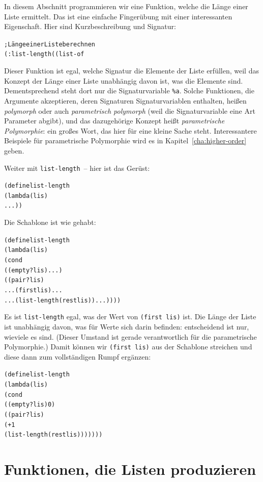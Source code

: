 In diesem Abschnitt programmieren wir eine Funktion, welche die Länge
einer Liste ermittelt. Das ist
eine einfache Fingerübung mit einer interessanten Eigenschaft.  Hier
sind Kurzbeschreibung und Signatur:
%
\begin{alltt}
; Länge einer Liste berechnen
(: list-length ((list-of %
\end{alltt}
%
Dieser Funktion ist egal, welche Signatur
die Elemente der Liste erfüllen, weil das Konzept der Länge einer
Liste unabhängig davon ist, was die Elemente sind.
Dementsprechend steht dort nur die Signaturvariable \verb|%a|.
Solche Funktionen, die Argumente akzeptieren, deren Signaturen
Signaturvariablen enthalten, heißen \textit{polymorph} oder auch
\textit{parametrisch polymorph} (weil die Signaturvariable eine Art
Parameter abgibt), und das dazugehörige Konzept heißt
\textit{parametrische
  Polymorphie}:
ein großes Wort, das hier für eine kleine Sache steht.  Interessantere
Beispiele für parametrische Polymorphie wird es in
Kapitel~\ref{cha:higher-order} geben.

Weiter mit \texttt{list-length}~-- hier ist das Gerüst:
%
\begin{alltt}
(define list-length
  (lambda (lis)
    ...))
\end{alltt}
%
Die Schablone ist wie gehabt:
%
\begin{alltt}
(define list-length
  (lambda (lis)
    (cond
      ((empty? lis) ...)
      ((pair? lis) 
       ... (first lis) ...
       ... (list-length (rest lis)) ...))))
\end{alltt}
%
Es ist \texttt{list-length} egal, was der Wert von \texttt{(first
  lis)} ist.  Die Länge der Liste ist unabhängig davon, was für Werte
sich darin befinden: entscheidend ist nur, wieviele es sind.  (Dieser
Umstand ist gerade verantwortlich für die parametrische Polymorphie.)
Damit können wir \texttt{(first lis)} aus der Schablone streichen und
diese dann zum vollständigen Rumpf ergänzen:
%
\begin{alltt}
(define list-length
  (lambda (lis)
    (cond
      ((empty? lis) 0)
      ((pair? lis) 
       (+ 1 
          (list-length (rest lis)))))))
\end{alltt}
%

\section{Funktionen, die Listen produzieren}

